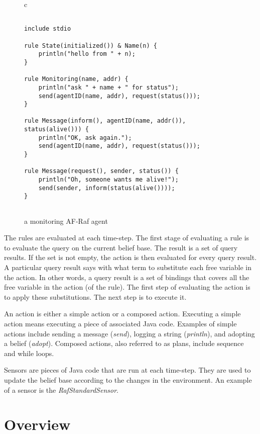 \documentclass[preprint]{sigplanconf} %
\begin{document}
\begin{figure}\footnotesize %
\begin{center}
\begin{tabular}{c}
\begin{lstlisting}[style=hs]

include stdio

rule State(initialized()) & Name(n) {
    println("hello from " + n);
}
  
rule Monitoring(name, addr) {
    println("ask " + name + " for status");
    send(agentID(name, addr), request(status()));
}

rule Message(inform(), agentID(name, addr()), status(alive())) {
    println("OK, ask again.");
    send(agentID(name, addr), request(status())); 
}
    
rule Message(request(), sender, status()) {
    println("Oh, someone wants me alive!");
    send(sender, inform(status(alive())));
}


\end{lstlisting}
\end{tabular}
\end{center}
\caption{a monitoring AF-Raf agent}
\label{fig:AF-Raf}
\end{figure} %

The rules are evaluated at each time-step. The first stage of evaluating a
rule is to evaluate the query on the current belief base. The result is a
set of query results. If the set is not empty, the action is then evaluated
for every query result. A particular query result says with what term to
substitute each free variable in the action. In other words, a query result
is a set of bindings that covers all the free variable in the action (of
the rule). The first step of evaluating the action is to apply these
substitutions. The next step is to execute it. 

An action is either a simple action or a composed action. Executing a
simple action means executing a piece of associated Java code. Examples of
simple actions include sending a message (\textit{send}), logging a string
(\textit{println}), and adopting a belief (\textit{adopt}).  Composed
actions, also referred to as plans, include sequence and while loops.

Sensors are pieces of Java code that are run at each time-step. They are
used to update the belief base according to the changes in the environment.
An example of a sensor is the \textit{RafStandardSensor}.

\section{Overview} %
\end{document}
